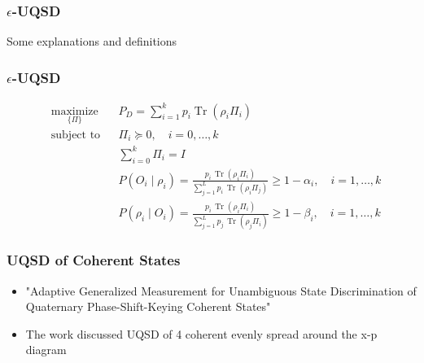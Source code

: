 \documentclass{beamer}
\begin{document}
\begin{frame}
  \frametitle{$\epsilon$-UQSD}
  Some explanations and definitions
\end{frame}

\begin{frame}
  \frametitle{$\epsilon$-UQSD}
  \begin{align}
     & \underset{\{\Pi\}}{\text{maximize}} &  & P_{D}=\sum_{i=1}^{k} p_{i} \operatorname{Tr}(\rho_{i} \Pi_{i})                                                                                                      \\
     & \text{subject to}                   &  & \Pi_{i} \succeq 0, \quad i = 0, \ldots, k                                                                                                                           \\
     &                                     &  & \sum_{i=0}^{k} \Pi_i = I                                                                                                                                            \\
     &                                     &  & P(O_i \mid \rho_i) = \frac{p_i \, \operatorname{Tr}(\rho_i \Pi_i)}{\sum_{j=1}^{L} p_i \, \operatorname{Tr}(\rho_i \Pi_j)} \geq 1 - \alpha_i, \quad i = 1, \ldots, k \\
     &                                     &  & P(\rho_i \mid O_i) = \frac{p_i \, \operatorname{Tr}(\rho_i \Pi_i)}{\sum_{j=1}^{L} p_j \, \operatorname{Tr}(\rho_j \Pi_i)} \geq 1 - \beta_i, \quad i = 1, \ldots, k
  \end{align}
\end{frame}


\begin{frame}
  \frametitle{UQSD of Coherent States}
  \begin{itemize}
    \item "Adaptive Generalized Measurement for Unambiguous
          State Discrimination of Quaternary Phase-Shift-Keying
          Coherent States"
    \item The work discussed UQSD of 4 coherent evenly spread
          around the x-p diagram
  \end{itemize}
\end{frame}
\end{document}
